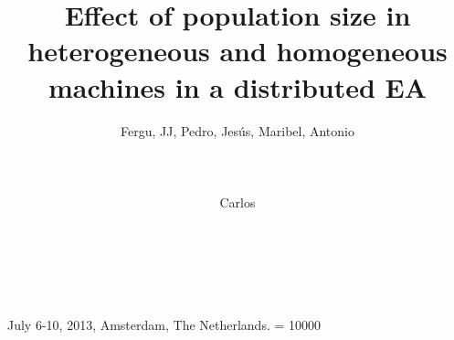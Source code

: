 \documentclass{sig-alternate}
\begin{document}
%
 {July 6-10, 2013, Amsterdam, The Netherlands.}
    \widowpenalty = 10000

\title{Effect of population size in heterogeneous and homogeneous machines in a distributed EA}

%
%
%
%
%


 \author{
 \alignauthor
 Fergu, JJ, Pedro, Jesús, Maribel, Antonio\\
        \\
        \\
        \\
 \alignauthor
 Carlos\\
 \\
 \\
 \\
 }

\end{document}
